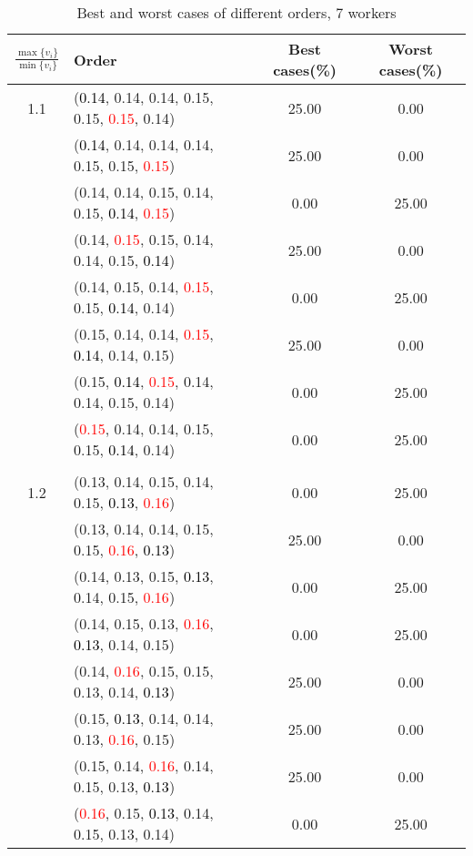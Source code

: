 \documentclass[10pt,a4paper]{report}
\begin{document}
\newpage\begin{center}
	\small
	\begin{longtable}{clcc}
		\caption{Best and worst cases of different orders, 7 workers}\\
		\toprule
		\setlength{\tabcolsep}{1mm}
		\renewcommand\baselinestretch{0.5}\selectfont
		$\frac{\max\{v_i\}}{\min\{v_i\}}$ & Order & Best cases(\%) & Worst cases(\%) \\
			\midrule		1.1			&(\textcolor{black}{0.14}, 0.14, 0.14, 0.15, 0.15, \textcolor{red}{0.15}, 0.14)&25.00&0.00\\
			&(\textcolor{black}{0.14}, 0.14, 0.14, 0.14, 0.15, 0.15, \textcolor{red}{0.15})&25.00&0.00\\
			&(0.14, 0.14, 0.15, 0.14, 0.15, \textcolor{black}{0.14}, \textcolor{red}{0.15})&0.00&25.00\\
			&(0.14, \textcolor{red}{0.15}, 0.15, 0.14, 0.14, 0.15, \textcolor{black}{0.14})&25.00&0.00\\
			&(0.14, 0.15, 0.14, \textcolor{red}{0.15}, 0.15, \textcolor{black}{0.14}, 0.14)&0.00&25.00\\
			&(0.15, 0.14, 0.14, \textcolor{red}{0.15}, \textcolor{black}{0.14}, 0.14, 0.15)&25.00&0.00\\
			&(0.15, \textcolor{black}{0.14}, \textcolor{red}{0.15}, 0.14, 0.14, 0.15, 0.14)&0.00&25.00\\
			&(\textcolor{red}{0.15}, 0.14, 0.14, 0.15, 0.15, \textcolor{black}{0.14}, 0.14)&0.00&25.00\\
		&&&\\
		1.2			&(0.13, 0.14, 0.15, 0.14, 0.15, \textcolor{black}{0.13}, \textcolor{red}{0.16})&0.00&25.00\\
			&(0.13, 0.14, 0.14, 0.15, 0.15, \textcolor{red}{0.16}, \textcolor{black}{0.13})&25.00&0.00\\
			&(0.14, 0.13, 0.15, \textcolor{black}{0.13}, 0.14, 0.15, \textcolor{red}{0.16})&0.00&25.00\\
			&(0.14, 0.15, 0.13, \textcolor{red}{0.16}, \textcolor{black}{0.13}, 0.14, 0.15)&0.00&25.00\\
			&(0.14, \textcolor{red}{0.16}, 0.15, 0.15, 0.13, 0.14, \textcolor{black}{0.13})&25.00&0.00\\
			&(0.15, \textcolor{black}{0.13}, 0.14, 0.14, 0.13, \textcolor{red}{0.16}, 0.15)&25.00&0.00\\
			&(0.15, 0.14, \textcolor{red}{0.16}, 0.14, 0.15, 0.13, \textcolor{black}{0.13})&25.00&0.00\\
			&(\textcolor{red}{0.16}, 0.15, \textcolor{black}{0.13}, 0.14, 0.15, 0.13, 0.14)&0.00&25.00\\

\end{longtable}
\end{center}
\end{document}
